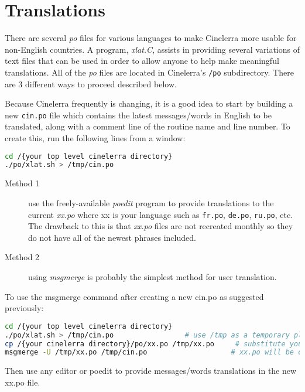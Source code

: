 \chapter{Translations}%
\label{cha:translations}

There are several \textit{po} files for various languages to make Cinelerra more usable for non-English countries.  A program, \textit{xlat.C}, assists in providing several variations of text files that can be used in order to allow anyone to help make meaningful translations.  All of the \textit{po} files are located in Cinelerra’s \texttt{/po} subdirectory. There are 3 different ways to proceed described below.

Because Cinelerra frequently is changing, it is a good idea to start by building a new \texttt{cin.po} file which contains the latest messages/words in English to be translated, along with a comment line of the routine name and line number.  To create this, run the following lines from a window:

\begin{lstlisting}[language=bash,numbers=none]
cd /{your top level cinelerra directory}
./po/xlat.sh > /tmp/cin.po
\end{lstlisting}

\begin{description}
	\item[Method 1]  use the freely-available \textit{poedit} program to provide translations to the current \textit{xx.po} where xx is your language such as \texttt{fr.po}, \texttt{de.po}, \texttt{ru.po}, etc.  The drawback to this is that \textit{xx.po} files are not recreated monthly so they do not have all of the newest phrases included.
	\item[Method 2] using \textit{msgmerge} is probably the simplest method for user translation.
\end{description}

To use the msgmerge command after creating a new cin.po as suggested previously:

\begin{lstlisting}[language=bash,numbers=none]
cd /{your top level cinelerra directory}
./po/xlat.sh > /tmp/cin.po			       # use /tmp as a temporary place
cp /{your cinelerra directory}/po/xx.po /tmp/xx.po     # substitute your language for x
msgmerge -U /tmp/xx.po /tmp/cin.po                    # xx.po will be overwritten to include updates
\end{lstlisting}

Then use any editor or poedit to provide messages/words translations in the new xx.po file.

